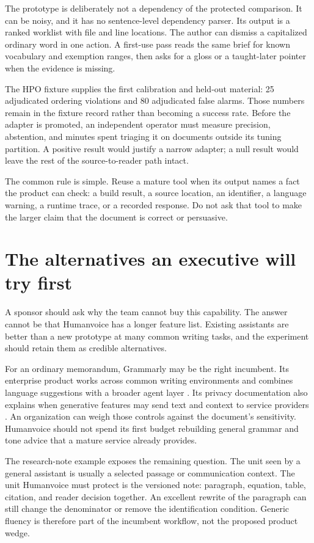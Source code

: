 The prototype is deliberately not a dependency of the protected comparison.
It can be noisy, and it has no sentence-level dependency parser. Its output is
a ranked worklist with file and line locations. The author can dismiss a
capitalized ordinary word in one action. A first-use pass reads the same brief
for known vocabulary and exemption ranges, then asks for a gloss or a
taught-later pointer when the evidence is missing.

The HPO fixture supplies the first calibration and held-out material: 25
adjudicated ordering violations and 80 adjudicated false alarms. Those numbers
remain in the fixture record rather than becoming a success rate. Before the
adapter is promoted, an independent operator must measure precision,
abstention, and minutes spent triaging it on documents outside its tuning
partition. A positive result would justify a narrow adapter; a null result
would leave the rest of the source-to-reader path intact.

The common rule is simple. Reuse a mature tool when its output names a fact the
product can check: a build result, a source location, an identifier, a language
warning, a runtime trace, or a recorded response. Do not ask that tool to make
the larger claim that the document is correct or persuasive.

\section{The alternatives an executive will try first}
\label{sec:component-alternatives}

A sponsor should ask why the team cannot buy this capability. The answer cannot
be that Humanvoice has a longer feature list. Existing assistants are better
than a new prototype at many common writing tasks, and the experiment should
retain them as credible alternatives.

For an ordinary memorandum, Grammarly may be the right incumbent. Its
enterprise product works across common writing environments and combines
language suggestions with a broader agent layer
\citep{grammarly2026enterprise}. Its privacy documentation also explains when
generative features may send text and context to service providers
\citep{grammarly2026privacy}. An organization can weigh those controls against
the document's sensitivity. Humanvoice should not spend its first budget
rebuilding general grammar and tone advice that a mature service already
provides.

The research-note example exposes the remaining question. The unit seen by a
general assistant is usually a selected passage or communication context. The
unit Humanvoice must protect is the versioned note: paragraph, equation, table,
citation, and reader decision together. An excellent rewrite of the paragraph
can still change the denominator or remove the identification condition.
Generic fluency is therefore part of the incumbent workflow, not the proposed
product wedge.

